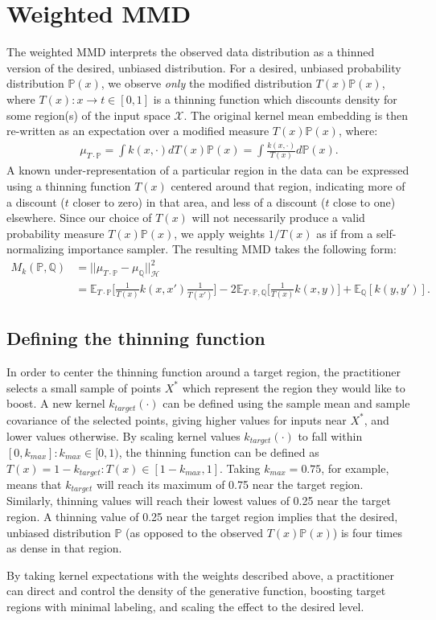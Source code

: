 \section{Weighted MMD}

The weighted MMD interprets the observed data distribution as a thinned version of the desired, unbiased distribution. For a desired, unbiased probability distribution $\mathbb{P}(x)$, we observe \textit{only} the modified distribution $T(x)\mathbb{P}(x)$, where $T(x): x \rightarrow t \in [0, 1]$ is a thinning function which discounts density for some region(s) of the input space $\mathcal{X}$. The original kernel mean embedding is then re-written as an expectation over a modified measure $T(x)\mathbb{P}(x)$, where:
\begin{align}
\mu_{T \cdot \mathbb{P}} = \int k(x,\cdot)dT(x)\mathbb{P}(x) = \int \frac{k(x,\cdot)}{T(x)}d\mathbb{P}(x).
\end{align}
A known under-representation of a particular region in the data can be expressed using a thinning function $T(x)$ centered around that region, indicating more of a discount ($t$ closer to zero) in that area, and less of a discount ($t$ close to one) elsewhere. Since our choice of $T(x)$ will not necessarily produce a valid probability measure $T(x)\mathbb{P}(x)$, we apply weights $1/T(x)$ as if from a self-normalizing importance sampler. The resulting MMD takes the following form:
\begin{align}
M_k(\mathbb{P}, \mathbb{Q}) &= ||\mu_{T \cdot \mathbb{P}} - \mu_{\mathbb{Q}}||^2_\mathcal{H} \\
&= \mathbb{E}_{T \cdot \mathbb{P}}\Big[\frac{1}{T(x)} k(x,x') \frac{1}{T(x')}\Big] - 2 \mathbb{E}_{T\cdot\mathbb{P}, \mathbb{Q}}\Big[\frac{1}{T(x)}k(x,y)\Big] + \mathbb{E}_{\mathbb{Q}}[k(y,y')].
\end{align}
\subsection{Defining the thinning function}
In order to center the thinning function around a target region, the practitioner selects a small sample of points $X^*$ which represent the region they would like to boost. A new kernel $k_{target}(\cdot)$ can be defined using the sample mean and sample covariance of the selected points, giving higher values for inputs near $X^*$, and lower values otherwise. By scaling kernel values $k_{target}(\cdot)$ to fall within $[0, k_{max}]: k_{max} \in [0,1)$, the thinning function can be defined as $T(x) = 1 - k_{target} : T(x) \in [1-k_{max}, 1]$. Taking $k_{max}=0.75$, for example, means that $k_{target}$ will reach its maximum of 0.75 near the target region. Similarly, thinning values will reach their lowest values of 0.25 near the target region. A thinning value of 0.25 near the target region implies that the desired, unbiased distribution $\mathbb{P}$ (as opposed to the observed $T(x)\mathbb{P}(x)$) is four times as dense in that region.

By taking kernel expectations with the weights described above, a practitioner can direct and control the density of the generative function, boosting target regions with minimal labeling, and scaling the effect to the desired level.
